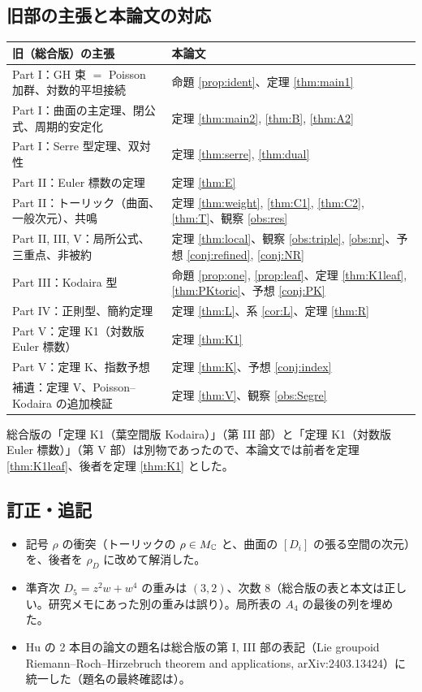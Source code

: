 \subsection{旧部の主張と本論文の対応}
\begin{center}\small
\begin{tabular}{>{\raggedright\arraybackslash}p{5.4cm}>{\raggedright\arraybackslash}p{9.2cm}}\toprule
旧（総合版）の主張 & 本論文 \\\midrule
Part I：GH 束 $=$ Poisson 加群、対数的平坦接続 & 命題 \ref{prop:ident}、定理 \ref{thm:main1}\\
Part I：曲面の主定理、閉公式、周期的安定化 & 定理 \ref{thm:main2}, \ref{thm:B}, \ref{thm:A2}\\
Part I：Serre 型定理、双対性 & 定理 \ref{thm:serre}, \ref{thm:dual}\\
Part II：Euler 標数の定理 & 定理 \ref{thm:E}\\
Part II：トーリック（曲面、一般次元）、共鳴 & 定理 \ref{thm:weight}, \ref{thm:C1}, \ref{thm:C2}, \ref{thm:T}、観察 \ref{obs:res}\\
Part II, III, V：局所公式、三重点、非被約 & 定理 \ref{thm:local}、観察 \ref{obs:triple}, \ref{obs:nr}、予想 \ref{conj:refined}, \ref{conj:NR}\\
Part III：Kodaira 型 & 命題 \ref{prop:one}, \ref{prop:leaf}、定理 \ref{thm:K1leaf}, \ref{thm:PKtoric}、予想 \ref{conj:PK}\\
Part IV：正則型、簡約定理 & 定理 \ref{thm:L}、系 \ref{cor:L}、定理 \ref{thm:R}\\
Part V：定理 K1（対数版 Euler 標数） & 定理 \ref{thm:K1}\\
Part V：定理 K、指数予想 & 定理 \ref{thm:K}、予想 \ref{conj:index}\\
補遺：定理 V、Poisson--Kodaira の追加検証 & 定理 \ref{thm:V}、観察 \ref{obs:Segre}\\\bottomrule
\end{tabular}
\end{center}
総合版の「定理 K1（葉空間版 Kodaira）」（第 III 部）と「定理 K1（対数版 Euler 標数）」（第 V 部）は別物であったので、本論文では前者を定理 \ref{thm:K1leaf}、後者を定理 \ref{thm:K1} とした。

\subsection{訂正・追記}
\begin{itemize}
\item 記号 $\rho$ の衝突（トーリックの $\rho\in M_\mathbb C$ と、曲面の $[D_i]$ の張る空間の次元）を、後者を $\rho_D$ に改めて解消した。
\item 準斉次 $D_5=z^2w+w^4$ の重みは $(3,2)$、次数 8（総合版の表と本文は正しい。研究メモにあった別の重みは誤り）。局所表の $A_4$ の最後の列を埋めた。
\item Hu の 2 本目の論文の題名は総合版の第 I, III 部の表記（Lie groupoid Riemann--Roch--Hirzebruch theorem and applications, arXiv:2403.13424）に統一した（題名の最終確認は\tQ）。
\end{itemize}

